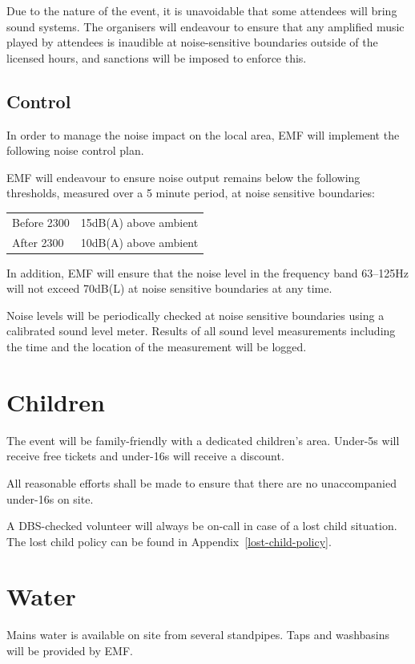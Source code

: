 Due to the nature of the event, it is unavoidable that some attendees will bring sound systems.
The organisers will endeavour to ensure that any amplified music played by attendees is inaudible at
noise-sensitive boundaries outside of the licensed hours, and sanctions will be imposed to enforce this.

\subsection{Control}

In order to manage the noise impact on the local area, EMF will implement the following noise control plan.

EMF will endeavour to ensure noise output remains below the following thresholds, measured over a 5 minute
period, at noise sensitive boundaries:

\begin{tabular}{l l}
  Before 2300 & 15dB(A) above ambient\\
  After 2300 & 10dB(A) above ambient\\
\end{tabular}

In addition, EMF will ensure that the noise level in the frequency band 63--125Hz will not exceed 70dB(L)
at noise sensitive boundaries at any time.

Noise levels will be periodically checked at noise sensitive boundaries using a calibrated sound level meter.
Results of all sound level measurements including the time and the location of the measurement will be logged.

\section{Children}

The event will be family-friendly with a dedicated children's area. Under-5s will receive free tickets
and under-16s will receive a discount.

All reasonable efforts shall be made to ensure that there are no unaccompanied under-16s on site.

A DBS-checked volunteer will always be on-call in case of a lost child situation. The lost child
policy can be found in Appendix~\ref{lost-child-policy}.

\section{Water}
Mains water is available on site from several standpipes. Taps and washbasins will be provided by EMF.

